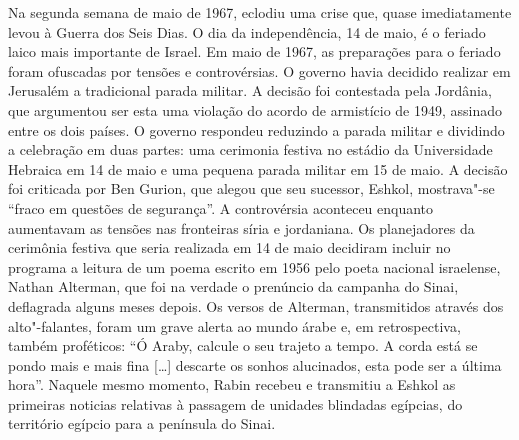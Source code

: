 Na segunda semana de maio de 1967, eclodiu uma crise que, quase
imediatamente levou à Guerra dos Seis Dias. O dia da independência, 14
de maio, é o feriado laico mais importante de Israel. Em maio de 1967, as
preparações para o feriado foram ofuscadas por tensões e controvérsias.
O governo havia decidido realizar em Jerusalém a tradicional parada
militar. A decisão foi contestada pela Jordânia, que argumentou ser esta
uma violação do acordo de armistício de 1949, assinado entre os
dois países. O governo respondeu reduzindo a parada militar e dividindo
a celebração em duas partes: uma cerimonia festiva no estádio da
Universidade Hebraica em 14 de maio e uma pequena parada militar em 15
de maio. A decisão foi criticada por Ben Gurion, que alegou que seu
sucessor, Eshkol, mostrava"-se ``fraco em questões de segurança''. A
controvérsia aconteceu enquanto aumentavam as tensões nas fronteiras
síria e jordaniana. Os planejadores da cerimônia festiva que seria
realizada em 14 de maio decidiram incluir no programa a leitura de um
poema escrito em 1956 pelo poeta nacional israelense, Nathan Alterman,
que foi na verdade o prenúncio da campanha do Sinai, deflagrada alguns
meses depois. Os versos de Alterman, transmitidos através dos
alto"-falantes, foram um grave alerta ao mundo árabe e, em
retrospectiva, também proféticos: ``Ó Araby, calcule o seu trajeto a
tempo. A corda está se pondo mais e mais fina {[}\ldots{}{]} descarte os sonhos
alucinados, esta pode ser a última hora''. Naquele mesmo momento, Rabin
recebeu e transmitiu a Eshkol as primeiras noticias relativas à
passagem de unidades blindadas egípcias, do território egípcio para a
península do Sinai.

